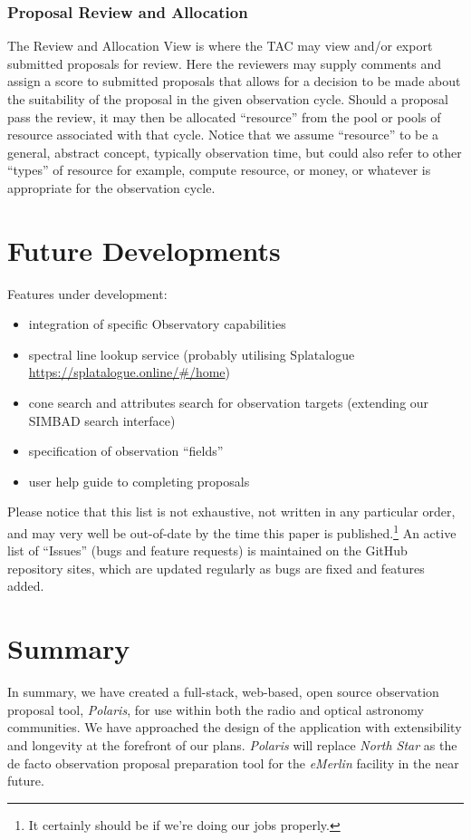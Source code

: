 \documentclass[11pt,twoside]{article}
\begin{document}
\subsubsection{Proposal Review and Allocation}\label{subsubsec:proposal-review-and-allocation}


The Review and Allocation View is where the TAC may view and/or export submitted proposals for review.
Here the reviewers may supply comments and assign a score to submitted proposals that allows for a decision
to be made about the suitability of the proposal in the given observation cycle.
Should a proposal pass the review, it may then be allocated ``resource'' from the pool or pools of resource
associated with that cycle.
Notice that we assume ``resource'' to be a general, abstract concept, typically observation
time, but could also refer to other ``types'' of resource for example, compute resource, or money, or
whatever is appropriate for the observation cycle.



\section{Future Developments}\label{sec:future-developments}
Features under development:
\begin{itemize}
    \item integration of specific Observatory capabilities
    \item spectral line lookup service (probably utilising Splatalogue \url{https://splatalogue.online/#/home})
    \item cone search and attributes search for observation targets (extending our SIMBAD search interface)
    \item specification of observation ``fields''
    \item user help guide to completing proposals
\end{itemize}
Please notice that this list is not exhaustive, not written in any particular order, and may very well be
out-of-date by the time this paper is published.\footnote{It certainly should be if we're doing our jobs
properly.}
An active list of ``Issues'' (bugs and feature requests) is maintained on the GitHub repository sites, which
are updated regularly as bugs are fixed and features added.


\section{Summary}\label{sec:summary}
In summary, we have created a full-stack, web-based, open source observation proposal tool, \emph{Polaris},
for use within both the radio and optical astronomy communities.
We have approached the design of the application with extensibility and longevity at the forefront of
our plans.
\emph{Polaris} will replace \emph{North Star} as the de facto observation proposal preparation tool for
the \emph{eMerlin} facility in the near future.
\end{document}
